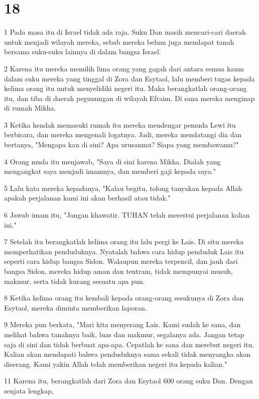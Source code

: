 \chapter{18}

\par 1 Pada masa itu di Israel tidak ada raja. Suku Dan masih mencari-cari daerah untuk menjadi wilayah mereka, sebab mereka belum juga mendapat tanah bersama suku-suku lainnya di dalam bangsa Israel.
\par 2 Karena itu mereka memilih lima orang yang gagah dari antara semua kaum dalam suku mereka yang tinggal di Zora dan Esytaol, lalu memberi tugas kepada kelima orang itu untuk menyelidiki negeri itu. Maka berangkatlah orang-orang itu, dan tiba di daerah pegunungan di wilayah Efraim. Di sana mereka menginap di rumah Mikha.
\par 3 Ketika hendak memasuki rumah itu mereka mendengar pemuda Lewi itu berbicara, dan mereka mengenali logatnya. Jadi, mereka mendatangi dia dan bertanya, "Mengapa kau di sini? Apa urusanmu? Siapa yang membawamu?"
\par 4 Orang muda itu menjawab, "Saya di sini karena Mikha. Dialah yang mengangkat saya menjadi imamnya, dan memberi gaji kepada saya."
\par 5 Lalu kata mereka kepadanya, "Kalau begitu, tolong tanyakan kepada Allah apakah perjalanan kami ini akan berhasil atau tidak."
\par 6 Jawab imam itu, "Jangan khawatir. TUHAN telah merestui perjalanan kalian ini."
\par 7 Setelah itu berangkatlah kelima orang itu lalu pergi ke Lais. Di situ mereka memperhatikan penduduknya. Nyatalah bahwa cara hidup penduduk Lais itu seperti cara hidup bangsa Sidon. Walaupun mereka terpencil, dan jauh dari bangsa Sidon, mereka hidup aman dan tentram, tidak mempunyai musuh, makmur, serta tidak kurang sesuatu apa pun.
\par 8 Ketika kelima orang itu kembali kepada orang-orang sesukunya di Zora dan Esytaol, mereka diminta memberikan laporan.
\par 9 Mereka pun berkata, "Mari kita menyerang Lais. Kami sudah ke sana, dan melihat bahwa tanahnya baik, luas dan makmur, segalanya ada. Jangan tetap saja di sini dan tidak berbuat apa-apa. Cepatlah ke sana dan merebut negeri itu. Kalian akan mendapati bahwa penduduknya sama sekali tidak menyangka akan diserang. Kami yakin Allah telah memberikan negeri itu kepada kalian."
\par 11 Karena itu, berangkatlah dari Zora dan Esytaol 600 orang suku Dan. Dengan senjata lengkap,
